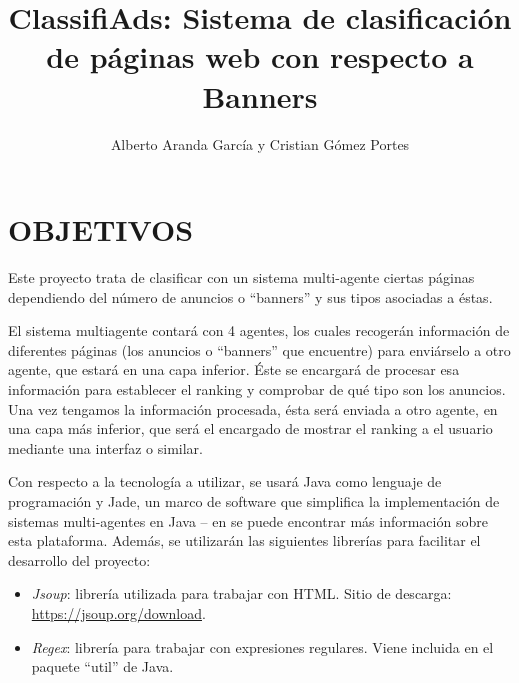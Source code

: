 \documentclass{pre-tfg}
\title{ClassifiAds: Sistema de clasificación de páginas web con respecto a Banners}
\author{Alberto Aranda García y Cristian Gómez Portes}
\begin{document}
\maketitle
\tableofcontents

\newpage

\section{OBJETIVOS}

Este proyecto trata de clasificar con un sistema multi-agente ciertas páginas dependiendo del número de anuncios o ``banners'' y sus tipos  asociadas a éstas.

El sistema multiagente contará con 4 agentes, los cuales recogerán información de diferentes páginas (los anuncios o ``banners'' que encuentre) para enviárselo a otro agente, que estará en una capa inferior. Éste se encargará de procesar esa información para establecer el ranking y comprobar de qué tipo son los anuncios. Una vez tengamos la información procesada, ésta será enviada a otro agente, en una capa más inferior, que será el encargado de mostrar el ranking a el usuario mediante una interfaz o similar.

Con respecto a la tecnología a utilizar, se usará Java como lenguaje de programación y Jade, un marco de software que simplifica la implementación de sistemas multi-agentes en Java -- en \cite{bellifemine2002jade} se puede encontrar más información sobre esta plataforma. Además, se utilizarán las siguientes librerías para facilitar el desarrollo del proyecto:

\begin{itemize}
 \item \textit{Jsoup}: librería utilizada para trabajar con HTML. Sitio de descarga: \url{https://jsoup.org/download}.
\item  \textit{Regex}: librería para trabajar con expresiones regulares. Viene incluida en el paquete ``util'' de Java.
\end{itemize}
\end{document}
